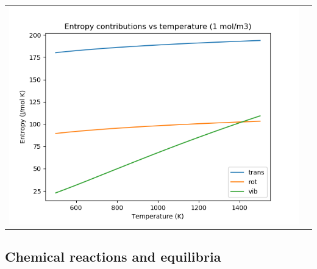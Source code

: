 \documentclass[11pt]{article}
\begin{document}
\begin{table}
\begin{tabular}{cc}
\includegraphics[scale=0.5]{./Images/ethane-entropy.png}
\end{tabular}
\end{table}

\subsection{Chemical reactions and equilibria}
\label{sec:orgcad2642}
\end{document}
